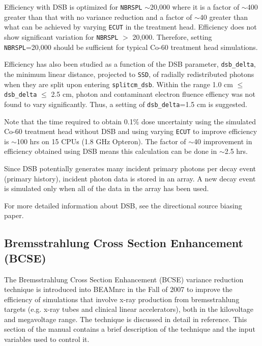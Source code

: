 \documentclass[12pt,twoside]{article}
\begin{document}
Efficiency with DSB is optimized for {\tt NBRSPL} $\sim$20,000 where it is a factor of $\sim$400 greater than that
with no variance reduction and a factor of $\sim$40 greater than what can be achieved by varying {\tt ECUT}
in the treatment head.  Efficiency does not show significant variation for {\tt NBRSPL} $>$ 20,000.  Therefore,
setting {\tt NBRSPL}=20,000 should be sufficient for typical Co-60 treatment head simulations.

Efficiency has also been studied as a function of the DSB parameter, {\tt dsb\_delta}, the minimum linear
distance, projected to {\tt SSD}, of radially redistributed photons when they are split upon entering {\tt splitcm\_dsb}.  Within the range 1.0 cm $\leq$ {\tt dsb\_delta} $\leq$ 2.5 cm, photon and contaminant electron fluence effiency
was not found to vary significantly.  Thus, a setting of {\tt dsb\_delta}=1.5 cm is suggested.

Note that the time required to obtain 0.1\% dose uncertainty using the simulated Co-60 treatment
head\cite{Mo99} without DSB and using varying {\tt ECUT} to improve efficiency is $\sim$100 hrs on 15 CPUs (1.8 GHz Opteron).  The factor of $\sim$40 improvement in efficiency obtained using DSB means this calculation can be done in
$\sim$2.5 hrs.

Since DSB potentially generates many incident primary photons per decay event (primary history), incident photon data is
stored in an array. A new decay event is simulated only when all of the data in the array has been used.

For more detailed information about DSB, see the directional source biasing paper\cite{Wa15}.

\subsection[BCSE]{Bremsstrahlung Cross Section Enhancement (BCSE)}
\label{BCSE}

The Bremsstrahlung Cross Section Enhancement (BCSE) variance reduction
technique is introduced into BEAMnrc in the Fall of 2007 to improve
the efficiency of simulations that involve x-ray production from
bremsstrahlung targets (e.g. x-ray tubes and clinical linear
accelerators), both in the kilovoltage and megavoltage range. The
technique is discussed in detail in reference\cite{AR07}. This
section of the manual contains a brief description of the technique
and the input variables used to control it.
\end{document}
